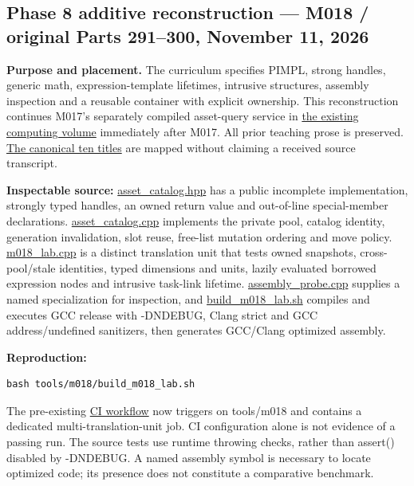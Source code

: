 \subsection{Phase 8 additive reconstruction --- M018 / original Parts 291--300, November 11, 2026}\label{appendix-a103e7846d21-phase-8-additive-reconstruction-m018-original-parts-291300-november-11-2026}

\textbf{Purpose and placement.} The curriculum specifies PIMPL, strong handles, generic math, expression-template lifetimes, intrusive structures, assembly inspection and a reusable container with explicit ownership. This reconstruction continues M017's separately compiled asset-query service in \hyperref[01-foundations-i-ch007-a-registry-crosses-its-last-c-boundary-hidden-implementation-typed-identity-and-measured-abstraction-cost]{the existing computing volume} immediately after M017. All prior teaching prose is preserved. \hyperref[appendix-fd090d982a15-m018-parts-291300-the-same-asset-service-becomes-a-typed-hidden-and-measurable-engine-api]{The canonical ten titles} are mapped without claiming a received source transcript.

\textbf{Inspectable source:} \hyperref[source-file-0529c78555b675a2ae111228]{asset\_catalog.hpp} has a public incomplete implementation, strongly typed handles, an owned return value and out-of-line special-member declarations. \hyperref[source-file-04abded74b7e03edc5dcf870]{asset\_catalog.cpp} implements the private pool, catalog identity, generation invalidation, slot reuse, free-list mutation ordering and move policy. \hyperref[source-file-8aedc3fdcd10c91971507448]{m018\_lab.cpp} is a distinct translation unit that tests owned snapshots, cross-pool/stale identities, typed dimensions and units, lazily evaluated borrowed expression nodes and intrusive task-link lifetime. \hyperref[source-file-eab7d4e282f0926fda89ab31]{assembly\_probe.cpp} supplies a named specialization for inspection, and \hyperref[source-file-c936569afa19be638ec87991]{build\_m018\_lab.sh} compiles and executes GCC release with -DNDEBUG, Clang strict and GCC address/undefined sanitizers, then generates GCC/Clang optimized assembly.

\textbf{Reproduction:}

\begin{verbatim}
bash tools/m018/build_m018_lab.sh
\end{verbatim}

The pre-existing \hyperref[source-file-3b1d957d4b185d11d5c207e1]{CI workflow} now triggers on tools/m018 and contains a dedicated multi-translation-unit job. CI configuration alone is not evidence of a passing run. The source tests use runtime throwing checks, rather than assert() disabled by -DNDEBUG. A named assembly symbol is necessary to locate optimized code; its presence does not constitute a comparative benchmark.

